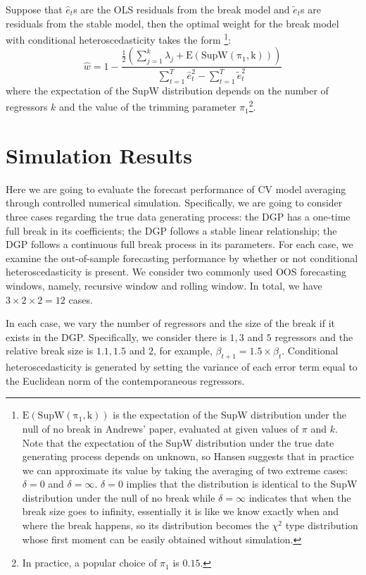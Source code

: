 \documentclass[a4paper,12pt]{article}
\begin{document}
\begin{lemma} \label{lem:2}
Suppose that $\hat{e}_t$s are the OLS residuals from the break model and $\tilde{e}_t$s are residuals from the stable model, then the optimal weight for the break model with conditional heteroscedasticity takes the form \footnote{$\mathrm{E(SupW(\pi_1,k))}$ is the expectation of the SupW distribution under the null of no break in Andrews' paper, evaluated at given values of $\pi$ and $k$. Note that the expectation of the SupW distribution under the true date generating process depends on unknown, so Hansen suggests that in practice we can approximate its value by taking the averaging of two extreme cases: $\delta = 0$ and $\delta = \infty$. $\delta = 0$ implies that the distribution is identical to the SupW distribution under the null of no break while $\delta = \infty$ indicates that when the break size goes to infinity, essentially it is like we know exactly when and where the break happens, so its distribution becomes the $\chi^2$ type distribution whose first moment can be easily obtained without simulation.}:
\begin{equation}
	\hat{w} = 1 - \frac{\frac{1}{2}(\sum_{j=1}^{k}\lambda_j + \mathrm{E(SupW(\pi_1,k))})}{\sum_{t=1}^{T}\hat{e}_t^2 - \sum_{t=1}^{T}\tilde{e}_t^2}
\end{equation}
where the expectation of the SupW distribution depends on the number of regressors $k$ and the value of the trimming parameter $\pi_1$\footnote{In practice, a popular choice of $\pi_1$ is $0.15$.}.
\end{lemma}
\section{Simulation Results}
Here we are going to evaluate the forecast performance of CV model averaging through controlled numerical simulation. Specifically, we are going to consider three cases regarding the true data generating process: the DGP has a one-time full break in its coefficients; the DGP follows a stable linear relationship; the DGP follows a continuous full break process in its parameters. For each case, we examine the out-of-sample forecasting performance by whether or not conditional heteroscedasticity is present. We consider two commonly used OOS forecasting windows, namely, recursive window and rolling window. In total, we have $3 \times 2 \times 2 = 12$ cases.

In each case, we vary the number of regressors and the size of the break if it exists in the DGP. Specifically, we consider there is $1,3$ and $5$ regressors and the relative break size is $1.1, 1.5$ and $2$, for example, $\beta_{t+1} = 1.5 \times \beta_{t}$. Conditional heteroscedasticity is generated by setting the variance of each error term equal to the Euclidean norm of the contemporaneous regressors.
\end{document}
